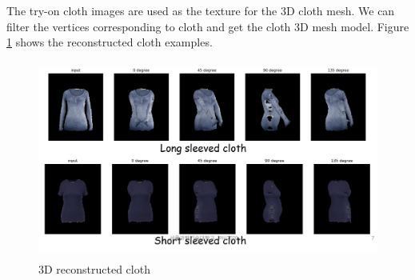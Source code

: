 The try-on cloth images are used as the texture for the 3D cloth mesh. We can filter the vertices corresponding to cloth and get the cloth 3D mesh model. Figure \ref{fig:3DreconstructedCloth} shows the reconstructed cloth examples. 


\begin{figure}[t]
\centering
\includegraphics[height=6.5cm]{figures/3dclothrecon.png}   %
\caption{3D reconstructed cloth}
\label{fig:3DreconstructedCloth}
\end{figure}



